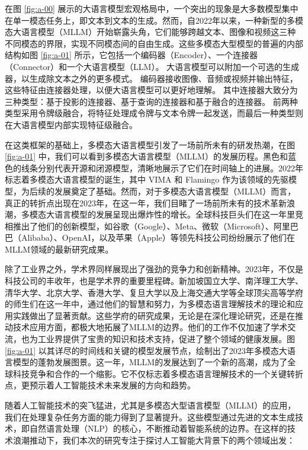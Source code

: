 在图 \ref{fig:a-00} 展示的大语言模型宏观格局中，一个突出的现象是大多数模型集中在单一模态任务上，即文本到文本的生成。然而，自2022年以来，一种新型的多模态大语言模型（MLLM）开始崭露头角，它们能够跨越文本、图像和视频这三种不同模态的界限，实现不同模态间的自由生成。这些多模态大型模型的普遍的内部结构如图 \ref{fig:a-01} 所示\cite{yin2024survey}，它包括一个编码器（Encoder）、一个连接器（Connector）和一个大语言模型（LLM）。 大语言模型可以附加一个可选的生成器，以生成除文本之外的更多模式。 编码器接收图像、音频或视频并输出特征，这些特征由连接器处理，以便大语言模型可以更好地理解。 其中连接器大致分为三种类型：基于投影的连接器、基于查询的连接器和基于融合的连接器。 前两种类型采用令牌级融合，将特征处理成令牌与文本令牌一起发送，而最后一种类型则在大语言模型内部实现特征级融合。

在这类框架的基础上，多模态大语言模型引发了一场前所未有的研发热潮，在图 \ref{fig:a-01} 中，我们可以看到多模态大语言模型（MLLM）的发展历程。黑色和蓝色的线条分别代表开源和闭源模型，清晰地展示了它们在时间轴上的进展。2022年标志着多模态大语言模型的诞生，其中 VIMA 和 Flamingo 作为该领域的先驱模型，为后续的发展奠定了基础。然而，对于多模态大语言模型（MLLM）而言，真正的转折点出现在2023年，在这一年，我们目睹了一场前所未有的技术革新浪潮，多模态大语言模型的发展呈现出爆炸性的增长。全球科技巨头们在这一年里竞相推出了他们的创新模型，如谷歌（Google）、Meta、微软（Microsoft）、阿里巴巴（Alibaba）、OpenAI，以及苹果（Apple）等领先科技公司纷纷展示了他们在MLLM领域的最新研究成果。

除了工业界之外，学术界同样展现出了强劲的竞争力和创新精神。2023年，不仅是科技公司的丰收年，也是学术界的重要里程碑。新加坡国立大学、南洋理工大学、清华大学、北京大学、香港大学、复旦大学以及上海交通大学等全球顶尖高等学府的师生们在这一年中，通过他们的智慧和努力，为多模态语言理解技术的理论和应用实践做出了显著贡献。这些学府的研究成果，无论是在深化理论研究，还是在推动技术应用方面，都极大地拓展了MLLM的边界。他们的工作不仅加速了学术交流，也为工业界提供了宝贵的知识和技术支持，促进了整个领域的健康发展。图 \ref{fig:a-01} 以其详尽的时间线和关键的模型发展节点，绘制出了2023年多模态大语言模型的蓬勃发展图景。这一年，MLLM的发展达到了一个新的高潮，成为了全球科技竞争和合作的一个缩影。它不仅标志着多模态语言理解技术的一个关键转折点，更预示着人工智能技术未来发展的方向和趋势。

随着人工智能技术的突飞猛进，尤其是多模态大型语言模型（MLLM）的应用，我们在处理复杂任务方面的能力得到了显著提升。这些模型通过先进的文本生成技术，即自然语言处理（NLP）的核心，不断推动着智能系统的边界。在这样的技术浪潮推动下，我们本次的研究专注于探讨人工智能大背景下的两个领域出发：

